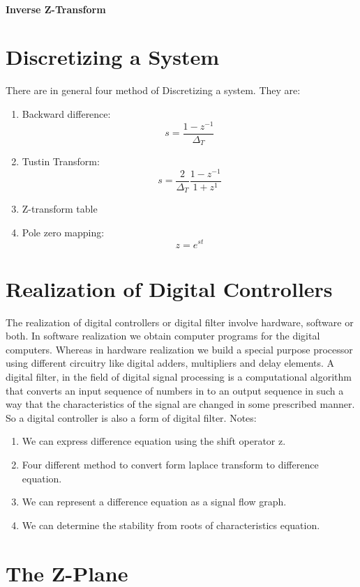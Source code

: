 \documentclass{article}
\begin{document}
\paragraph{Inverse Z-Transform}

\section{Discretizing a System}
There are in general four method of Discretizing a system. They are:
\begin{enumerate}
	\item Backward difference: \[s = \frac{1-z^{-1}}{\Delta_T}\]
	\item Tustin Transform: \[s = \frac{2}{\Delta_T} \frac{1- z^{-1}}{1 + z^{1}}\]
	\item Z-transform table
	\item Pole zero mapping: \[z = e^{st}\]
\end{enumerate}
\section{Realization of Digital Controllers}
The realization of digital controllers or digital filter involve hardware, software or both. In software realization we obtain computer programs for the digital computers. Whereas in hardware realization we build a special purpose processor using different circuitry like digital adders, multipliers and delay elements. A digital filter, in the field of digital signal processing is a computational algorithm that converts an input sequence of numbers in to an output sequence in such a way that the characteristics of the signal are changed in some prescribed manner. So a digital controller is also a form of digital filter.
\newline
Notes:
\begin{enumerate}
	\item We can express difference equation using the shift operator z.
	\item Four different method to convert form laplace transform to difference equation.
	\item We can represent a difference equation as a signal flow graph.
	\item We can determine the stability from roots of characteristics equation.
\end{enumerate}

\section{The Z-Plane}
\end{document}
